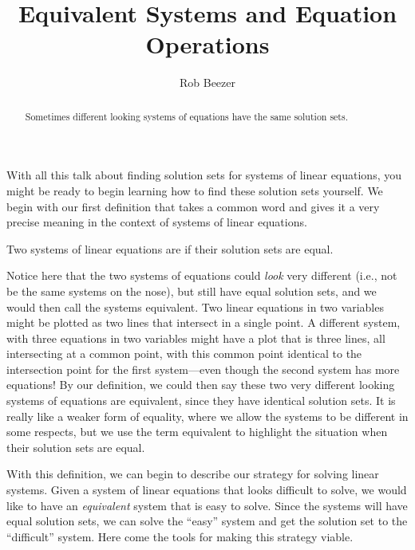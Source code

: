 \documentclass{ximera}
\author{Rob Beezer}
\title{Equivalent Systems and Equation Operations}
\begin{document}
\begin{abstract}
  Sometimes different looking systems of equations have the same solution sets.
\end{abstract}
\maketitle

With all this talk about finding solution sets for systems of linear
equations, you might be ready to begin learning how to find these
solution sets yourself.  We begin with our first definition that takes
a common word and gives it a very precise meaning in the context of
systems of linear equations.

\begin{definition}
  Two systems of linear equations are  if
  their solution sets are equal.
\end{definition}

Notice here that the two systems of equations could \textit{look} very
different (i.e., not be the same systems on the nose), but still have
equal solution sets, and we would then call the systems equivalent.
Two linear equations in two variables might be plotted as two lines
that intersect in a single point.  A different system, with three
equations in two variables might have a plot that is three lines, all
intersecting at a common point, with this common point identical to
the intersection point for the first system---even though the second
system has more equations!  By our definition, we could then say these
two very different looking systems of equations are equivalent, since
they have identical solution sets.  It is really like a weaker form of
equality, where we allow the systems to be different in some respects,
but we use the term equivalent to highlight the situation when their
solution sets are equal.

With this definition, we can begin to describe our strategy for
solving linear systems.  Given a system of linear equations that looks
difficult to solve, we would like to have an \textit{equivalent}
system that is easy to solve.  Since the systems will have equal
solution sets, we can solve the ``easy'' system and get the solution
set to the ``difficult'' system.  Here come the tools for making this
strategy viable.
\end{document}
